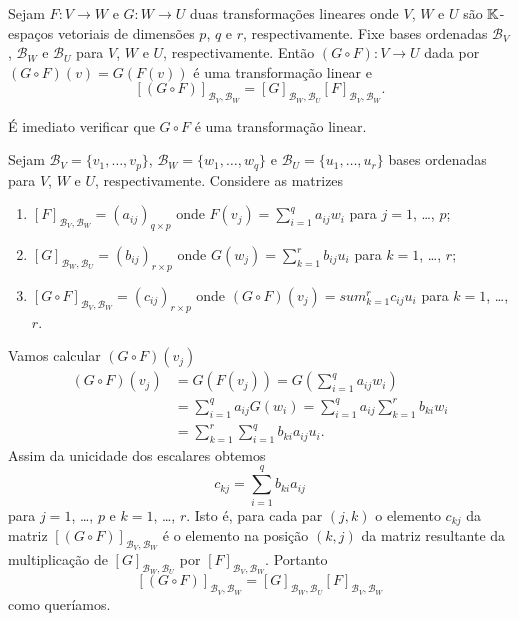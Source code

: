 \begin{teorema}\label{matriz_da_composicao_de_transformacoes}
	Sejam $F : V \to W$ e $G : W \to U$ duas transformações lineares onde $V$, $W$ e $U$ são $\mathbb{K}$-espaços vetoriais de dimensões $p$, $q$ e $r$, respectivamente. Fixe bases ordenadas $\mathcal{B}_V$, $\mathcal{B}_W$ e $\mathcal{B}_U$ para $V$, $W$ e $U$, respectivamente. Então $(G \circ F) : V \to U$ dada por $(G\circ F)(v) = G(F(v))$ é uma transformação linear e
	\[
		[(G \circ F)]_{{\mathcal{B}_V},{\mathcal{B}_W}} = [G]_{{\mathcal{B}_W},{\mathcal{B}_U}}[F]_{{\mathcal{B}_V},{\mathcal{B}_W}}.
	\]
\end{teorema}
\begin{prova}
	É imediato verificar que $G\circ F$ é uma transformação linear.

	Sejam $\mathcal{B}_V = \{v_1,\dots,v_p\}$, $\mathcal{B}_W = \{w_1,\dots,w_q\}$ e $\mathcal{B}_U = \{u_1,\dots,u_r\}$ bases ordenadas para $V$, $W$ e $U$, respectivamente. Considere as matrizes
	\begin{enumerate}
		\item $[F]_{{\mathcal{B}_V},{\mathcal{B}_W}} = (a_{ij})_{q\times p}$ onde $F(v_j) = \sum_{i=1}^qa_{ij}w_i$ para $j=1$, \dots, $p$;
		\item $[G]_{{\mathcal{B}_W},{\mathcal{B}_U}} = (b_{ij})_{r\times p}$ onde $G(w_j) = \sum_{k=1}^rb_{ij}u_i$ para $k=1$, \dots, $r$;
		\item $[G \circ F]_{{\mathcal{B}_V},{\mathcal{B}_W}} = (c_{ij})_{r\times p}$ onde $(G\circ F)(v_j) = sum_{k=1}^rc_{ij}u_i$ para $k=1$, \dots, $r$.
	\end{enumerate}

	Vamos calcular $(G\circ F)(v_j)$
	\begin{align*}
		(G\circ F)(v_j) &= G(F(v_j)) = G(\sum_{i=1}^qa_{ij}w_i)\\
		&= \sum_{i=1}^qa_{ij}G(w_i) = \sum_{i=1}^qa_{ij}\sum_{k=1}^rb_{ki}w_i\\
		&= \sum_{k=1}^r\sum_{i=1}^qb_{ki}a_{ij}u_i.
	\end{align*}
	Assim da unicidade dos escalares obtemos
	\[
		c_{kj} = \sum_{i=1}^qb_{ki}a_{ij}
	\]
	para $j=1$, \dots, $p$ e $k = 1$, \dots, $r$. Isto é, para cada par $(j,k)$ o elemento $c_{kj}$ da matriz $[(G\circ F)]_{{\mathcal{B}_V},{\mathcal{B}_W}}$ é o elemento na posição $(k,j)$ da matriz resultante da multiplicação de $[G]_{{\mathcal{B}_W},{\mathcal{B}_U}}$ por $[F]_{{\mathcal{B}_V},{\mathcal{B}_W}}$. Portanto
	\[
		[(G\circ F)]_{{\mathcal{B}_V},{\mathcal{B}_W}} = [G]_{{\mathcal{B}_W},{\mathcal{B}_U}}[F]_{{\mathcal{B}_V},{\mathcal{B}_W}}
	\]
	como queríamos.
\end{prova}

